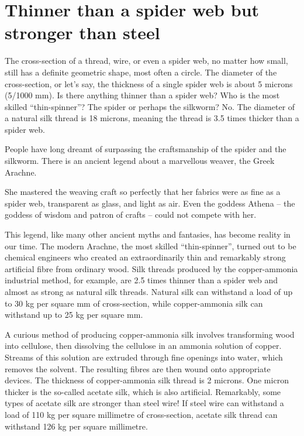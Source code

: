 \section{Thinner than a spider web but stronger than steel}
\label{sec-11.3}

The cross-section of a thread, wire, or even a spider web, no matter how small, still has a definite geometric shape, most often a circle. The diameter of the cross-section, or let's say, the thickness of a single spider web is about 5 microns (5/1000 mm). Is there anything thinner than a spider web? Who is the most skilled ``thin-spinner''? The spider or perhaps the silkworm? No. The diameter of a natural silk thread is 18 microns, meaning the thread is 3.5 times thicker than a spider web.

People have long dreamt of surpassing the craftsmanship of the spider and the silkworm. There is an ancient legend about a marvellous weaver, the Greek Arachne.

She mastered the weaving craft so perfectly that her fabrics were as fine as a spider web, transparent as glass, and light as air. Even the goddess Athena -- the goddess of wisdom and patron of crafts -- could not compete with her.

This legend, like many other ancient myths and fantasies, has become reality in our time. The modern Arachne, the most skilled ``thin-spinner'', turned out to be chemical engineers who created an extraordinarily thin and remarkably strong artificial fibre from ordinary wood. Silk threads produced by the copper-ammonia industrial method, for example, are 2.5 times thinner than a spider web and almost as strong as natural silk threads. Natural silk can withstand a load of up to 30 kg per square mm of cross-section, while copper-ammonia silk can withstand up to 25 kg per square mm.


A curious method of producing copper-ammonia silk involves transforming wood into cellulose, then dissolving the cellulose in an ammonia solution of copper. Streams of this solution are extruded through fine openings into water, which removes the solvent. The resulting fibres are then wound onto appropriate devices. The thickness of copper-ammonia silk thread is 2 microns. One micron thicker is the so-called acetate silk, which is also artificial. Remarkably, some types of acetate silk are stronger than steel wire! If steel wire can withstand a load of 110 kg per square millimetre of cross-section, acetate silk thread can withstand 126 kg per square millimetre.


